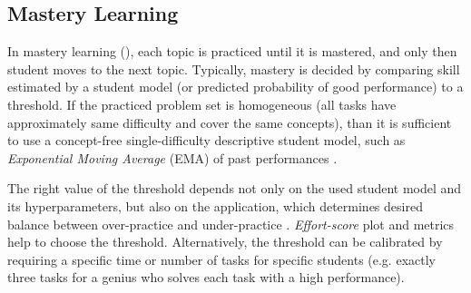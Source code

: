 \subsection{Mastery Learning}
\label{sec:mastery-learning}

In mastery learning (\cite{mastery-learning-scale}), each topic
is practiced until it is mastered, and only then student moves
to the next topic.  %
Typically, mastery is decided by comparing skill estimated by a student model
(or predicted probability of good performance) to a threshold. %
If the practiced problem set is homogeneous (all tasks have approximately same difficulty
and cover the same concepts), than it is sufficient to use a concept-free
single-difficulty descriptive student model,  %
such as \emph{Exponential Moving Average} (EMA) of past performances
\cite{alg.mastery}.

The right value of the threshold depends not only on the used student model and
its hyperparameters, but also on the application, which determines desired
balance between over-practice and under-practice
\cite{mastery-overpractice-underpractice-tradeoff, mastery-evaluation-model}.
\emph{Effort-score} plot and metrics
\cite{alg.mastery, evaluation-leopard, learner-models-integration-skills} %
help to choose the threshold.
Alternatively, the threshold can be calibrated by requiring a specific time or
number of tasks for specific students (e.g. exactly three tasks for a genius who
solves each task with a high performance). %



